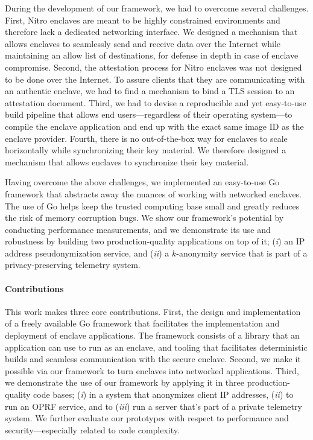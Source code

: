 During the development of our framework, we had to overcome several challenges.
First, Nitro enclaves are meant to be highly constrained environments and
therefore lack a dedicated networking interface.  We designed a mechanism that
allows enclaves to seamlessly send and receive data over the Internet while
maintaining an allow list of destinations, for defense in depth in case of
enclave compromise.
%
Second, the attestation process for Nitro enclaves was not designed to be done
over the Internet.  To assure clients that they are communicating with an
authentic enclave, we had to find a mechanism to bind a TLS session to an
attestation document.
%
Third, we had to devise a reproducible and yet easy-to-use build pipeline that
allows end users---regardless of their operating system---to compile the enclave
application and end up with the exact same image ID as the enclave provider.
%
Fourth, there is no out-of-the-box way for enclaves to scale horizontally while
synchronizing their key material.  We therefore designed a mechanism that allows
enclaves to synchronize their key material.

Having overcome the above challenges, we implemented an easy-to-use Go framework
that abstracts away the nuances of working with networked enclaves.  The use of
Go helps keep the trusted computing base small and greatly reduces the risk of
memory corruption bugs.  We show our framework's potential by conducting
performance measurements, and we demonstrate its use and robustness by building
two production-quality applications on top of it; (\emph{i}) an IP address
pseudonymization service, and (\emph{ii}) a $k$-anonymity service that is part
of a privacy-preserving telemetry system.

\paragraph{Contributions}

This work makes three core contributions.
%
First, the design and implementation of a freely available Go framework that
facilitates the implementation and deployment of enclave applications.  The
framework consists of a library that an application can use to run as an
enclave, and tooling that facilitates deterministic builds and seamless
communication with the secure enclave.
%
Second, we make it possible via our framework to turn enclaves into networked
applications.
%
Third, we demonstrate the use of our framework by applying it in three
production-quality code bases; (\emph{i}) in a system that anonymizes client IP
addresses, (\emph{ii}) to run an OPRF service, and to (\emph{iii}) run a server
that's part of a private telemetry system.  We further evaluate our prototypes
with respect to performance and security---especially related to code
complexity.

